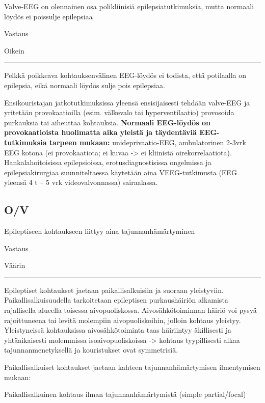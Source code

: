 \documentclass[
]{book}
\begin{document}
Valve-EEG on olennainen osa polikliinisiä epilepsiatutkimuksia, mutta normaali löydös ei poissulje epilepsiaa

Vastaus

Oikein

\begin{center}\rule{0.5\linewidth}{0.5pt}\end{center}

Pelkkä poikkeava kohtauksenvälinen EEG-löydös ei todista, että potilaalla on epilepsia, eikä normaali löydös sulje pois epilepsiaa.

Ensikouristajan jatkotutkimuksissa yleensä ensisijaisesti tehdään valve-EEG ja yritetään provokaatioilla (esim. välkevalo tai hyperventilaatio) provosoida purkauksia tai aiheuttaa kohtauksia. \textbf{Normaali EEG-löydös on provokaatioista huolimatta aika yleistä ja täydentäviä EEG-tutkimuksia tarpeen mukaan:} unideprivaatio-EEG, ambulatorinen 2-3vrk EEG kotona (ei provokaatiota; ei kuvaa -\textgreater{} ei kliinistä oirekorrelaatiota). Hankalahoitoisissa epilepsioissa, erotusdiagnostisissa ongelmissa ja epilepsiakirurgiaa suunniteltaessa käytetään aina VEEG-tutkimusta (EEG yleensä 4 t -- 5 vrk videovalvonnassa) sairaalassa.

\subsection{O/V}\label{ov-10}

Epileptiseen kohtaukseen liittyy aina tajunnanhämärtyminen

Vastaus

Väärin

\begin{center}\rule{0.5\linewidth}{0.5pt}\end{center}

Epileptiset kohtaukset jaetaan paikallisalkuisiin ja suoraan yleistyviin. Paikallisalkuisuudella tarkoitetaan epileptisen purkaushäiriön alkamista rajallisella alueella toisessa aivopuoliskossa. Aivosähkötoiminnan häiriö voi pysyä rajoittuneena tai levitä molempiin aivopuoliskoihin, jolloin kohtaus yleistyy. Yleistyneissä kohtauksissa aivosähkötoiminta taas häiriintyy äkillisesti ja yhtäaikaisesti molemmissa isoaivopuoliskoissa -\textgreater{} kohtaus tyypillisesti alkaa tajunnanmenetyksellä ja kouristukset ovat symmetrisiä.

Paikallisalkuiset kohtaukset jaetaan kahteen tajunnanhämärtymisen ilmentymisen mukaan:

Paikallisalkuinen kohtaus ilman tajunnanhämärtymistä (simple partial/focal)
\end{document}
